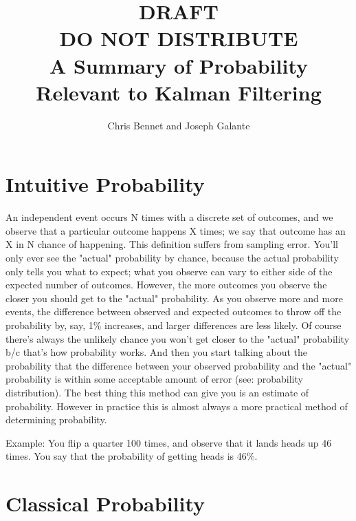 \documentclass{article}
\title{DRAFT\\DO NOT DISTRIBUTE\\A Summary of Probability Relevant to Kalman Filtering }
\author{Chris Bennet and Joseph Galante }
\date{}%
\begin{document}
\maketitle

\section{Intuitive Probability}

An independent event occurs N times with a discrete set of outcomes, and we observe that a particular outcome happens X times; we say that outcome has an X in N chance of happening.  This definition suffers from sampling error.  You'll only ever see the "actual" probability by chance, because the actual probability only tells you what to expect; what you observe can vary to either side of the expected number of outcomes. However, the more outcomes you observe the closer you should get to the "actual" probability.  As you observe more and more events, the difference between observed and expected outcomes to throw off the probability by, say, 1\% increases, and larger differences are less likely.  Of course there's always the unlikely chance you won't get closer to the "actual" probability b/c that's how probability works. And then you start talking about the probability that the difference between your observed probability and the "actual" probability is within some acceptable amount of error (see: probability distribution).  The best thing this method can give you is an estimate of probability.  However in practice this is almost always a more practical method of determining probability. 


Example:  You flip a quarter 100 times, and observe that it lands heads up 46 times.  You say that the probability of getting heads is 46\%.



\section{Classical Probability}
\end{document}
